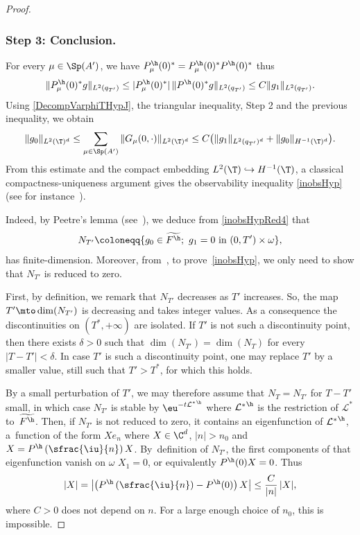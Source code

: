 \begin{proof}
\subsubsection*{Step 3: Conclusion.}
For every $\mu \in \Sp(A')$, we have
$P^\h_\mu(0)^*=P^\h_\mu(0)^* P^\h(0)^*$ thus
\[
\|P^\h_\mu(0)^* g\|_{L^2(q_{T'})} \leq |P^\h_\mu(0)^*|\, \| P^\h(0)^* g\|_{L^2(q_{T'})} \leq C \|g_1\|_{L^2(q_{T'})}.
\]
Using \eqref{DecompVarphiTHypJ}, the triangular inequality, Step 2 and the previous inequality, we obtain
\begin{equation} \label{inobsHypRed4}
\|g_0\|_{L^2(\T)^d} \leq \sum_{\mu \in \Sp(A')} \|G_\mu(0,\cdot)\|_{L^2(\T)^d}
\leq C \bigl(\|g_1\|_{L^2(q_{T'})^d}+ \| g_0\|_{H^{-1}(\T)^d} \bigr).
\end{equation}
From this estimate and the compact embedding $L^2(\T) \hookrightarrow H^{-1}(\T)$, a classical com\-pact\-ness-uniqueness argument gives the observability inequality \eqref{inobsHyp} (see for instance~\cite[Lem.\,2.1 and Rem.\,2.2]{duprez_2018b}).

Indeed, by Peetre's lemma (see~\cite[Lem.\,3]{peetre_1961}), we deduce from \eqref{inobsHypRed4} that\vspace*{-3pt}
\[
N_{T'} \coloneqq \{g_{0} \in \widetilde{F^{\h}};\ g_{1} = 0\ \text{in}\ (0,T')\times\omega\},
\]
has finite-dimension. Moreover, from~\cite[Lem.\,4]{peetre_1961}, to prove~\eqref{inobsHyp}, we only need to show that $N_{T'}$ is reduced to zero.

First, by definition, we remark that $N_{T'}$ decreases as $T'$ increases. So, the map $T' \mto \dim(N_{T'})$ is decreasing and takes integer values. As a consequence the discontinuities on $(T^\ast,+\infty)$ are isolated. If $T'$ is not such a discontinuity point, then there exists $\delta>0$ such that $\dim(N_{T'})=\dim(N_{T})$ for every $|T-T'|<\delta$. In case $T'$ is such a discontinuity point, one may replace $T'$ by a smaller value, still such that $T'>T^\ast$, for which this holds.

By a small perturbation of $T'$, we may therefore assume that $N_T = N_{T'}$ for $T-T'$ small, in which case $N_{T'}$ is stable by $\eu^{-t {\mathcal{L}^*}^\h}$ where ${\mathcal{L}^*}^\h$ is the restriction of ${\mathcal{L}^*}$ to~$\widetilde{F^\h}$. Then, if $N_{T'}$ is not reduced to zero, it contains an eigenfunction of ${\mathcal{L}^*}^\h$, \ie a~function of the form $X e_n$ where $X \in \C^d$, $|n|>n_0$ and $X =P^\h\left(\sfrac{\iu}{n}\right) X$. By~definition of $N_{T'}$, the first components of that eigenfunction vanish on $\omega$ \ie $X_1=0$, or equivalently $P^\h(0)X=0$. Thus\vspace*{-3pt}
\[
|X| = \left| \left(P^\h\left(\sfrac{\iu}{n}\right) - P^\h (0) \right) X \right| \leq \frac{C}{|n|}\, |X|,
\]
where $C>0$ does not depend on $n$. For a large enough choice of $n_0$, this is impossible.
\end{proof}

